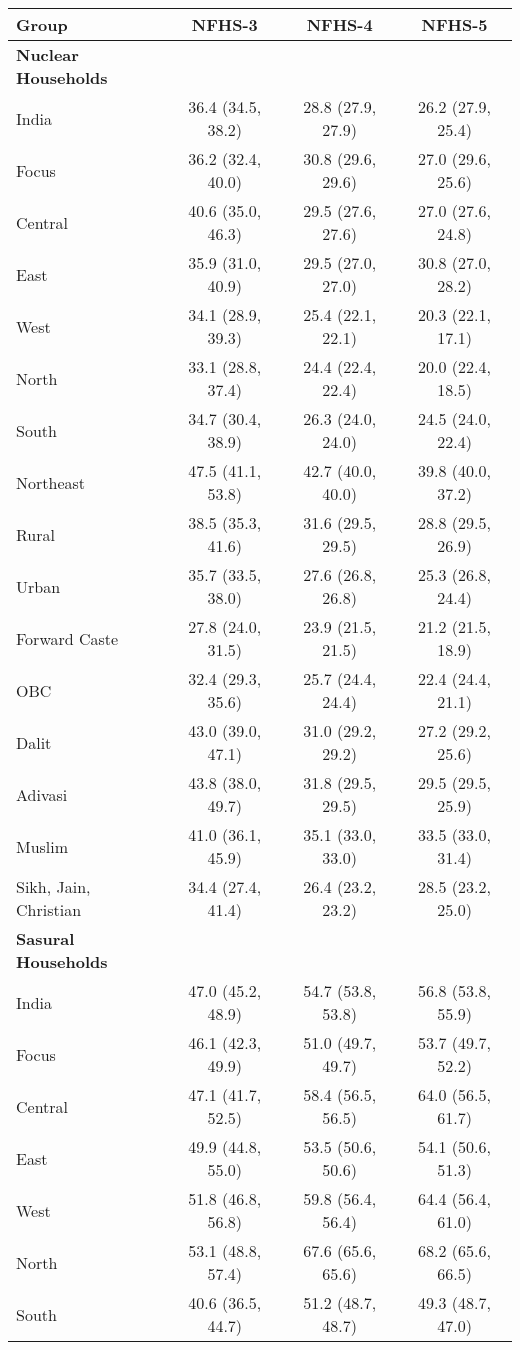 \begin{tabular}{lccc}
\toprule
Group & NFHS-3 & NFHS-4 & NFHS-5 \\
\midrule
\textbf{Nuclear Households}&&&\\
India&36.4 (34.5, 38.2)&28.8 (27.9, 27.9)&26.2 (27.9, 25.4)\\
Focus&36.2 (32.4, 40.0)&30.8 (29.6, 29.6)&27.0 (29.6, 25.6)\\
Central&40.6 (35.0, 46.3)&29.5 (27.6, 27.6)&27.0 (27.6, 24.8)\\
East&35.9 (31.0, 40.9)&29.5 (27.0, 27.0)&30.8 (27.0, 28.2)\\
West&34.1 (28.9, 39.3)&25.4 (22.1, 22.1)&20.3 (22.1, 17.1)\\
North&33.1 (28.8, 37.4)&24.4 (22.4, 22.4)&20.0 (22.4, 18.5)\\
South&34.7 (30.4, 38.9)&26.3 (24.0, 24.0)&24.5 (24.0, 22.4)\\
Northeast&47.5 (41.1, 53.8)&42.7 (40.0, 40.0)&39.8 (40.0, 37.2)\\
Rural&38.5 (35.3, 41.6)&31.6 (29.5, 29.5)&28.8 (29.5, 26.9)\\
Urban&35.7 (33.5, 38.0)&27.6 (26.8, 26.8)&25.3 (26.8, 24.4)\\
Forward Caste&27.8 (24.0, 31.5)&23.9 (21.5, 21.5)&21.2 (21.5, 18.9)\\
OBC&32.4 (29.3, 35.6)&25.7 (24.4, 24.4)&22.4 (24.4, 21.1)\\
Dalit&43.0 (39.0, 47.1)&31.0 (29.2, 29.2)&27.2 (29.2, 25.6)\\
Adivasi&43.8 (38.0, 49.7)&31.8 (29.5, 29.5)&29.5 (29.5, 25.9)\\
Muslim&41.0 (36.1, 45.9)&35.1 (33.0, 33.0)&33.5 (33.0, 31.4)\\
Sikh, Jain, Christian&34.4 (27.4, 41.4)&26.4 (23.2, 23.2)&28.5 (23.2, 25.0)\\
\textbf{Sasural Households}&&&\\
India&47.0 (45.2, 48.9)&54.7 (53.8, 53.8)&56.8 (53.8, 55.9)\\
Focus&46.1 (42.3, 49.9)&51.0 (49.7, 49.7)&53.7 (49.7, 52.2)\\
Central&47.1 (41.7, 52.5)&58.4 (56.5, 56.5)&64.0 (56.5, 61.7)\\
East&49.9 (44.8, 55.0)&53.5 (50.6, 50.6)&54.1 (50.6, 51.3)\\
West&51.8 (46.8, 56.8)&59.8 (56.4, 56.4)&64.4 (56.4, 61.0)\\
North&53.1 (48.8, 57.4)&67.6 (65.6, 65.6)&68.2 (65.6, 66.5)\\
South&40.6 (36.5, 44.7)&51.2 (48.7, 48.7)&49.3 (48.7, 47.0)\\

\end{tabular}
